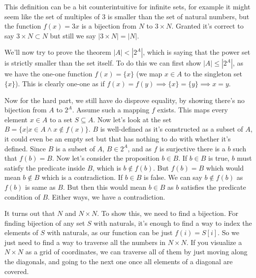 \documentclass[a4paper,10pt]{article}
\theoremstyle{definition} %
\begin{document}
    This definition can be a bit counterintuitive for infinite sets, for example it might
    seem like the set of multiples of 3 is smaller than the set of natural numbers, but the 
    function $f(x) = 3x$ is a bijection from $N$ to $3 \times N$. Granted it's correct to say 
    $3 \times N \subset N$ but still we say $|3 \times N| = |N|$.

    We'll now try to prove the theorem $|A| < |2^A|$, which is saying that the power 
    set is strictly smaller than the set itself. To do this we can first show $|A| \leq 
    |2^A|$, as we have the one-one function $f(x) = \{x\}$ (we map $x \in A$ to the singleton
    set $\{x\}$). This is clearly one-one as if $f(x) = f(y) \implies \{x\} = \{y\} \implies
    x = y$.

    Now for the hard part, we still have do disprove equality, by showing there's no
    bijection from $A$ to $2^A$. Assume such a mapping $f$ exists. This maps every element
    $x \in A$ to a set $S \subseteq A$. Now let's look at the set $B = \{x | x \in A \land 
    x \notin f(x)\}$. $B$ is well-defined as it's constructed as a subset of $A$, it could even
    be an empty set but that has nothing to do with whether it's defined. Since $B$ is a subset
    of $A$, $B \in 2^A$, and as $f$ is surjective there is a $b$ such that $f(b) = B$. Now let's 
    consider the proposition $b \in B$. If $b \in B$ is true, $b$ must satisfy the predicate 
    inside $B$, which is $b \notin f(b)$. But $f(b) = B$ which would mean $b \notin B$ which is 
    a contradiction. If $b \in B$ is false. We can say $b \notin f(b)$ as $f(b)$ is same as $B$.
    But then this would mean $b \in B$ as $b$ satisfies the predicate condition of $B$. Either 
    ways, we have a contradiction.

    It turns out that $N$ and $N \times N$. To show this, we need to find a bijection.
    For finding bijection of any set $S$ with naturals, it's enough to find a way to index
    the elements of $S$ with naturals, as our function can be just $f(i) = S[i]$. So we just 
    need to find a way to traverse all the numbers in $N \times N$. If you visualize a $N \times
    N$ as a grid of coordinates, we can traverse all of them by just moving along the diagonals,
    and going to the next one once all elements of a diagonal are covered.
\end{document}
